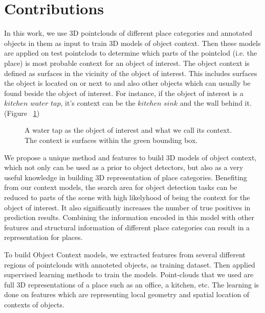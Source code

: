 \section {Contributions}
\label{Contributions.sec}
In this work, we use 3D pointclouds of different place categories and annotated objects in them as input to train 3D models of object context. Then these models are applied on test pointclods to determine which parts of the pointclod (i.e. the place) is most probable context for an object of interest. The object context is defined as surfaces in the vicinity of the object of interest. This includes surfaces the object is located on or next to and also other objects which can usually be found beside the object of interest. 
For instance, if the object of interest is a $kitchen$ $water$ $tap$, it's context can be the 
$kitchen$ $sink$ and the wall behind it. (Figure ~\ref{contextExample.figure})

\begin{figure}[t]
  \caption[Illustration of a sample Context.]
  {A water tap as the object of interest and what we call its context. The context is surfaces within the green 
  bounding box.}
  \label{contextExample.figure}
\end{figure}

We propose a unique method and features to build 3D models of object context, which not only can be used as a prior to 
object detectors, but also as a very useful knowledge in building 3D representation of place categories. 
Benefiting from our context models, the search area for object detection tasks can be reduced to parts of the scene with high 
likelyhood of being the context for the object of interest. 
It also significantly increases the number of true positives in prediction results. 
Combining the information encoded in this model with other features and structural information of different place categories can 
result in a representation for places.
 
 To build Object Context models, we extracted features from several different regions of pointclouds with annoteted objects, as training dataset. Then applied supervised learning methods to train the models. Point-clouds that we used are full 3D representations of a place such as an office, a kitchen, etc. 
 The learning is done on features which are representing local geometry and spatial location of contexts of objects.
 
